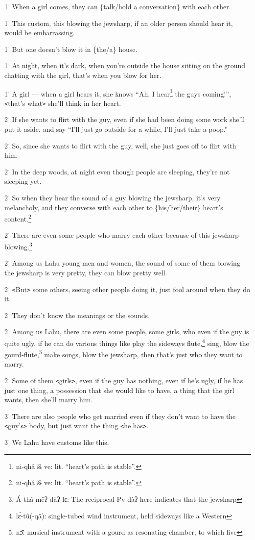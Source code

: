 1\. When a girl comes, they can \{talk/hold a conversation\} with each other.

1\. This custom, this blowing the jewsharp, if an older person should hear it,
would be embarrassing.

1\. But one doesn't blow it in \{the/a\} house.

1\. At night, when it's dark, when you're outside the house sitting on the ground
chatting with the girl, that's when you blow for her.

1\. A girl --- when a girl hears it, she knows ``Ah, I hear\footnote{ni-qhâ šɨ ve: lit. ``heart's path is stable''.} the guys coming!'',
\texttt{<}that's what\texttt{>} she'll think in her heart.

2\. If she wants to flirt with the guy, even if she had been doing some work she'll
put it aside, and say ``I'll just go outside for a while, I'll just take a poop.''

2\. So, since she wants to flirt with the guy, well, she just goes off to flirt
with him.

2\. In the deep woods, at night even though people are sleeping, they're not sleeping
yet.

2\. So when they hear the sound of a guy blowing the jewsharp, it's very melancholy,
and they converse with each other to \{his/her/their\} heart's content.\footnote{ni-qhâ šɨ ve: lit. ``heart's path is stable''.}

2\. There are even some people who marry each other because of this jewsharp blowing.\footnote{Á-thâ mêʔ dàʔ lɛ: The reciprocal Pv dàʔ here indicates that the jewsharp}

2\. Among us Lahu young men and women, the sound of some of them blowing the jewsharp
is very pretty, they can blow pretty well.

2\. \texttt{<}But\texttt{>} some others, seeing other people doing it, just fool
around when they do it.

2\. They don't know the meanings or the sounds.

2\. Among us Lahu, there are even some people, some girls, who even if the guy
is quite ugly, if he can do various things like play the sideways flute,\footnote{lɛ́-tû(-qâ): single-tubed wind instrument, held sideways like a Western} sing,
blow the gourd-flute,\footnote{nɔ̄: musical instrument with a gourd as resonating chamber, to which five} make songs, blow the jewsharp, then that's just who they
want to marry.

2\. Some of them \texttt{<}girls\texttt{>}, even if the guy has nothing, even if
he's ugly, if he has just one thing, a possession that she would like to have,
a thing that the girl wants, then she'll marry him.

3\. There are also people who get married even if they don't want to have the \texttt{<}guy's\texttt{>}
body, but just want the thing \texttt{<}he has\texttt{>}.

3\. We Lahu have customs like this.

